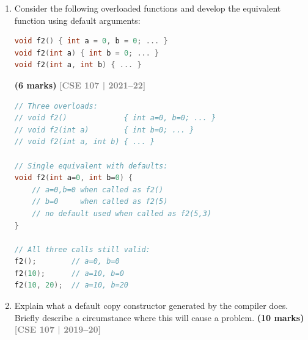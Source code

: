 \documentclass[12pt,a3paper]{article}
\newcommand{\yr}[1]{\hfill\textcolor{gray}{\small\textbf{[#1]}}}
\newcommand{\mk}[1]{\textcolor{orange!70!black}{\small\textbf{(#1 marks)}}}
\begin{document}
\begin{enumerate}
\begin{tcolorbox}[enhanced,breakable,ansbox,colback=cE!4,colframe=cE,
  boxrule=0.8pt,arc=5pt,
  title={\textbf{Answer --- new vs malloc; design Class A}},
  fonttitle=\bfseries\color{white},colbacktitle=cE]
\textbf{Class A --- needs both default and parameterised constructor:}
\begin{lstlisting}[language=C++]
class A {
    int val;
public:
    A(): val(0){}      // default: needed for new A[1]
    A(int v): val(v){} // parameterised: needed for A obj(10)
};
int main() {
    A obj(10);       // parameterised
    A *array = new A[1]; // default
    delete[] array;
}
\end{lstlisting}

\end{tcolorbox}


\item Consider the following overloaded functions and develop the equivalent function using default arguments:
\begin{lstlisting}[language=C++]
void f2() { int a = 0, b = 0; ... }
void f2(int a) { int b = 0; ... }
void f2(int a, int b) { ... }
\end{lstlisting}
\mk{6}
\yr{CSE 107 | 2021--22}


\begin{tcolorbox}[enhanced,breakable,ansbox,colback=cE!4,colframe=cE,
  boxrule=0.8pt,arc=5pt,
  title={\textbf{Answer --- Overloaded f2() using default arguments}},
  fonttitle=\bfseries\color{white},colbacktitle=cE]

\begin{lstlisting}[language=C++]
// Three overloads:
// void f2()             { int a=0, b=0; ... }
// void f2(int a)        { int b=0; ... }
// void f2(int a, int b) { ... }

// Single equivalent with defaults:
void f2(int a=0, int b=0) {
    // a=0,b=0 when called as f2()
    // b=0     when called as f2(5)
    // no default used when called as f2(5,3)
}

// All three calls still valid:
f2();        // a=0, b=0
f2(10);      // a=10, b=0
f2(10, 20);  // a=10, b=20
\end{lstlisting}

\end{tcolorbox}

\item Explain what a default copy constructor generated by the compiler does. Briefly describe a circumstance where this will cause a problem. \mk{10}
\yr{CSE 107 | 2019--20}

\begin{tcolorbox}[enhanced,breakable,ansbox,colback=cE!4,colframe=cE,
  boxrule=0.8pt,arc=5pt,
  title={\textbf{Answer --- Compiler-generated copy constructor and its problem}},
  fonttitle=\bfseries\color{white},colbacktitle=cE]


\end{tcolorbox}
\end{enumerate}
\end{document}

